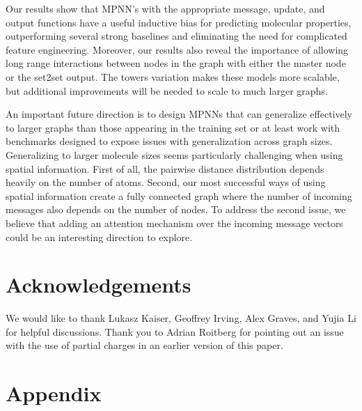 \documentclass{article}
\begin{document}
Our results show that MPNN’s with the appropriate message, update, and output functions have a useful inductive bias for predicting molecular properties, outperforming several strong baselines and eliminating the need for complicated feature engineering. Moreover, our results also reveal the importance of allowing long range interactions between nodes in the graph with either the master node or the set2set output. The towers variation makes these models more scalable, but additional improvements will be needed to scale to much larger graphs. 

An important future direction is to design MPNNs that can generalize effectively to larger graphs than those appearing in the training set or at least work with benchmarks designed to expose issues with generalization across graph sizes. Generalizing to larger molecule sizes seems particularly challenging when using spatial information. First of all, the pairwise distance distribution depends heavily on the number of atoms. Second, our most successful ways of using spatial information create a fully connected graph where the number of incoming messages also depends on the number of nodes. To address the second issue, we believe that adding an attention mechanism over the incoming message vectors could be an interesting direction to explore. 



\section*{Acknowledgements} 

We would like to thank Lukasz Kaiser, Geoffrey Irving, Alex Graves, and Yujia Li for helpful discussions. Thank you to Adrian Roitberg for pointing out an issue with the use of partial charges in an earlier version of this paper.




\section{Appendix}
\end{document}
